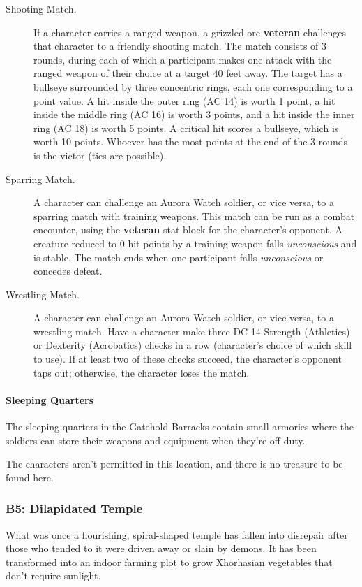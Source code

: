 \documentclass[a4paper, 11pt, bg=full, twocolumn, nooutline]{dndbook}
\begin{document}
\begin{description}
\item[Shooting Match.] If a character carries a ranged weapon, a grizzled orc \textbf{veteran} challenges that character to a friendly shooting match. The match consists of 3 rounds, during each of which a participant makes one attack with the ranged weapon of their choice at a target 40 feet away. The target has a bullseye surrounded by three concentric rings, each one corresponding to a point value. A hit inside the outer ring (AC 14) is worth 1 point, a hit inside the middle ring (AC 16) is worth 3 points, and a hit inside the inner ring (AC 18) is worth 5 points. A critical hit scores a bullseye, which is worth 10 points. Whoever has the most points at the end of the 3 rounds is the victor (ties are possible).
\item[Sparring Match.] A character can challenge an Aurora Watch soldier, or vice versa, to a sparring match with training weapons. This match can be run as a combat encounter, using the \textbf{veteran} stat block for the character's opponent. A creature reduced to 0 hit points by a training weapon falls \textit{unconscious} and is stable. The match ends when one participant falls \textit{unconscious} or concedes defeat.
\item[Wrestling Match.] A character can challenge an Aurora Watch soldier, or vice versa, to a wrestling match. Have a character make three DC 14 Strength (Athletics) or Dexterity (Acrobatics) checks in a row (character's choice of which skill to use). If at least two of these checks succeed, the character's opponent taps out; otherwise, the character loses the match.
\end{description}

\paragraph{Sleeping Quarters}

The sleeping quarters in the Gatehold Barracks contain small armories where the soldiers can store their weapons and equipment when they're off duty.

The characters aren't permitted in this location, and there is no treasure to be found here.

\subsubsection{B5: Dilapidated Temple}

What was once a flourishing, spiral-shaped temple has fallen into disrepair after those who tended to it were driven away or slain by demons. It has been transformed into an indoor farming plot to grow Xhorhasian vegetables that don't require sunlight.
\end{document}

